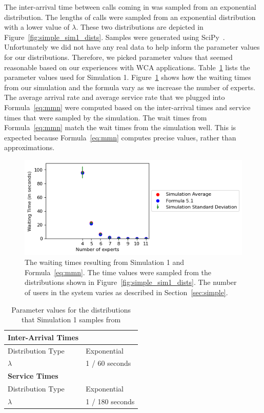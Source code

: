 \pagebreak

The inter-arrival time between calls coming in was sampled from an exponential
distribution.
The lengths of calls were sampled from an exponential distribution with
a lower value of $\lambda$.
These two distributions are depicted in Figure~\ref{fig:simple_sim1_dists}.
Samples were generated using SciPy~\cite{scipy}.
Unfortunately we did not have any real data to help inform the parameter values
for our distributions.
Therefore, we picked parameter values that seemed reasonable based on our
experiences with WCA applications.
Table~\ref{tab:sim1_params} lists the parameter values used for Simulation 1.
Figure~\ref{fig:simple_sim1_results} shows how the waiting times from our
simulation and the formula vary as we increase the number of experts.
The average arrival rate and average service rate that we plugged into
Formula~\ref{eq:mmn} were computed based on the inter-arrival times and service
times that were sampled by the simulation.
The wait times from Formula~\ref{eq:mmn} match the wait times from the
simulation well.
This is expected because Formula~\ref{eq:mmn} computes precise values, rather
than approximations.

\begin{figure}[h]
  \includegraphics{figures/montecarlo/independent_calls_expon.png}
  \vspace{-1cm}
  \caption[
  The waiting times resulting from Simulation 1 and Formula~\ref{eq:mmn}
  ]{
    The waiting times resulting from Simulation 1 and Formula~\ref{eq:mmn}.
    The time values were sampled from the distributions shown in
    Figure~\ref{fig:simple_sim1_dists}.
    The number of users in the system varies as described in
    Section~\ref{sec:simple}.
  }\label{fig:simple_sim1_results}
\end{figure}

\begin{table}
  \begin{tabular}{|l|l|}
    \hline
    \textbf{Inter-Arrival Times} & \\
    \hline
    Distribution Type & Exponential\\
    \hline
    $\lambda$ & 1 / 60 seconds\\
    \hline
    \hline
    \textbf{Service Times} & \\
    \hline
    Distribution Type & Exponential\\
    \hline
    $\lambda$ & 1 / 180 seconds\\
    \hline
  \end{tabular}
  \caption{
    Parameter values for the distributions that Simulation 1 samples from
  }\label{tab:sim1_params}
\end{table}

